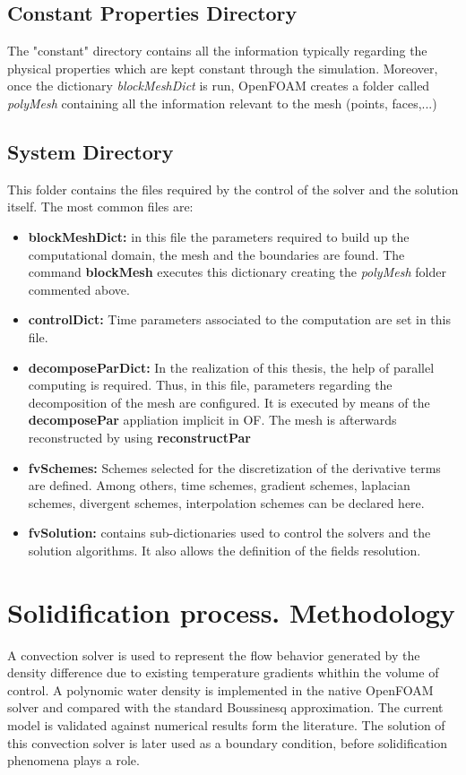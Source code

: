 \subsection{Constant Properties Directory}
The "constant" directory contains all the information typically regarding the physical properties which are kept constant through the simulation. Moreover, once the dictionary \textit{blockMeshDict} is run, OpenFOAM creates a folder called \textit{polyMesh} containing all the information relevant to the mesh (points, faces,...) 
\subsection{System Directory}
This folder contains the files required by the control of the solver and the solution itself. The most common files are:
\begin{itemize}
	\item \textbf{blockMeshDict:} in this file the parameters required to build up the computational domain, the mesh and the boundaries are found. The command \textbf{blockMesh} executes this dictionary creating the \textit{polyMesh} folder commented above.
	\item \textbf{controlDict:} Time parameters associated to the computation are set in this file. 
	\item \textbf{decomposeParDict:} In the realization of this thesis, the help of parallel computing is required. Thus, in this file, parameters regarding the decomposition of the mesh are configured. It is executed by means of the \textbf{decomposePar} appliation implicit in OF. The mesh is afterwards reconstructed by using \textbf{reconstructPar} 
	\item \textbf{fvSchemes:} Schemes selected for the discretization of the derivative terms are defined. Among others, time schemes, gradient schemes, laplacian schemes, divergent schemes, interpolation schemes can be declared here.
	\item \textbf{fvSolution:} contains sub-dictionaries used to control the solvers and the solution algorithms. It also allows the definition of the fields resolution.
\end{itemize}


\section{Solidification process. Methodology}
A convection solver is used to represent the flow behavior generated by the density difference due to existing temperature gradients whithin the volume of control. A polynomic water density is implemented in the native OpenFOAM solver and compared with the standard Boussinesq approximation. The current model is validated against numerical results form the literature. The solution of this convection solver is later used as a boundary condition, before solidification phenomena plays a role.

